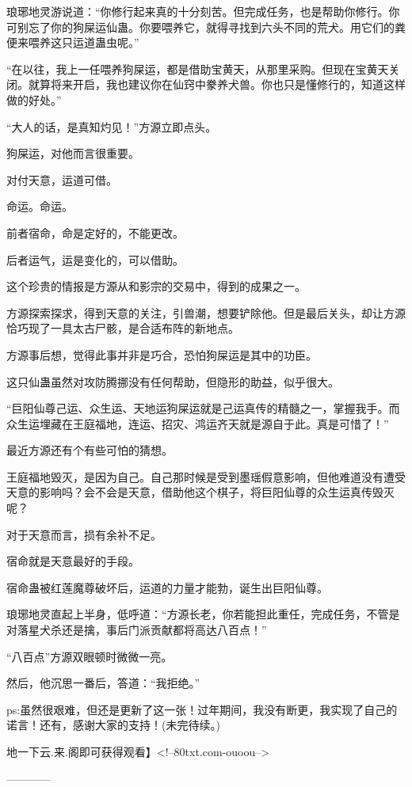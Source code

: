 \begin{this_body}
琅琊地灵游说道：“你修行起来真的十分刻苦。但完成任务，也是帮助你修行。你可别忘了你的狗屎运仙蛊。你要喂养它，就得寻找到六头不同的荒犬。用它们的粪便来喂养这只运道蛊虫呢。”

“在以往，我上一任喂养狗屎运，都是借助宝黄天，从那里采购。但现在宝黄天关闭。就算将来开启，我也建议你在仙窍中豢养犬兽。你也只是懂修行的，知道这样做的好处。”

“大人的话，是真知灼见！”方源立即点头。

狗屎运，对他而言很重要。

对付天意，运道可借。

命运。命运。

前者宿命，命是定好的，不能更改。

后者运气，运是变化的，可以借助。

这个珍贵的情报是方源从和影宗的交易中，得到的成果之一。

方源探索探求，得到天意的关注，引兽潮，想要铲除他。但是最后关头，却让方源恰巧现了一具太古尸骸，是合适布阵的新地点。

方源事后想，觉得此事并非是巧合，恐怕狗屎运是其中的功臣。

这只仙蛊虽然对攻防腾挪没有任何帮助，但隐形的助益，似乎很大。

“巨阳仙尊己运、众生运、天地运狗屎运就是己运真传的精髓之一，掌握我手。而众生运埋藏在王庭福地，连运、招灾、鸿运齐天就是源自于此。真是可惜了！”

最近方源还有个有些可怕的猜想。

王庭福地毁灭，是因为自己。自己那时候是受到墨瑶假意影响，但他难道没有遭受天意的影响吗？会不会是天意，借助他这个棋子，将巨阳仙尊的众生运真传毁灭呢？

对于天意而言，损有余补不足。

宿命就是天意最好的手段。

宿命蛊被红莲魔尊破坏后，运道的力量才能勃，诞生出巨阳仙尊。

琅琊地灵直起上半身，低呼道：“方源长老，你若能担此重任，完成任务，不管是对落星犬杀还是擒，事后门派贡献都将高达八百点！”

“八百点”方源双眼顿时微微一亮。

然后，他沉思一番后，答道：“我拒绝。”

ps:虽然很艰难，但还是更新了这一张！过年期间，我没有断更，我实现了自己的诺言！还有，感谢大家的支持！(未完待续。)

地一下云.来.阁即可获得观看】<!--80txt.com-ouoou-->

------------

\end{this_body}

